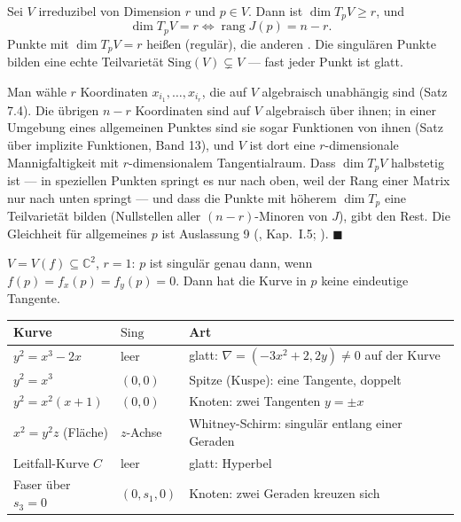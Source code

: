 \begin{merksatz}
Sei $V$ irreduzibel von Dimension $r$ und $p\in V$. Dann ist $\dim T_pV\ge r$, und
\[ \dim T_pV = r \iff \operatorname{rang}J(p) = n - r . \]
Punkte mit $\dim T_pV = r$ heißen  (regulär), die anderen . Die singulären Punkte bilden eine echte Teilvarietät $\mathrm{Sing}(V)\subsetneq V$ --- fast jeder Punkt ist glatt.

Man wähle $r$ Koordinaten $x_{i_1}, \ldots, x_{i_r}$, die auf $V$ algebraisch unabhängig sind (Satz 7.4). Die übrigen $n - r$ Koordinaten sind auf $V$ algebraisch über ihnen; in einer Umgebung eines allgemeinen Punktes sind sie sogar Funktionen von ihnen (Satz über implizite Funktionen, Band 13), und $V$ ist dort eine $r$-dimensionale Mannigfaltigkeit mit $r$-dimensionalem Tangentialraum. Dass $\dim T_pV$ halbstetig ist --- in speziellen Punkten springt es nur nach oben, weil der Rang einer Matrix nur nach unten springt --- und dass die Punkte mit höherem $\dim T_p$ eine Teilvarietät bilden (Nullstellen aller $(n - r)$-Minoren von $J$), gibt den Rest. Die Gleichheit für allgemeines $p$ ist Auslassung 9 (, Kap.~I.5; ). $\blacksquare$

$V = V(f)\subseteq\mathbb C^{2}$, $r = 1$: $p$ ist singulär genau dann, wenn $f(p) = f_x(p) = f_y(p) = 0$. Dann hat die Kurve in $p$ keine eindeutige Tangente.

\begin{center}
{\small
\renewcommand{\arraystretch}{1.5}
\begin{tabular}{@{}P{2.8cm}P{2.4cm}P{3.6cm}@{}}
\toprule
\textbf{Kurve} & $\mathrm{Sing}$ & \textbf{Art}\\
\midrule
$y^{2} = x^{3} - 2x$ & leer & glatt: $\nabla = (-3x^{2} + 2, 2y) \ne 0$ auf der Kurve\\
$y^{2} = x^{3}$ & $(0,0)$ & Spitze (Kuspe): eine Tangente, doppelt\\
$y^{2} = x^{2}(x + 1)$ & $(0,0)$ & Knoten: zwei Tangenten $y = \pm x$\\
$x^{2} = y^{2}z$ (Fläche) & $z$-Achse & Whitney-Schirm: singulär entlang einer Geraden\\
Leitfall-Kurve $C$ & leer & glatt: Hyperbel\\
Faser über $s_3 = 0$ & $(0, s_1, 0)$ & Knoten: zwei Geraden kreuzen sich\\
\bottomrule
\end{tabular}}
\end{center}


\end{merksatz}
